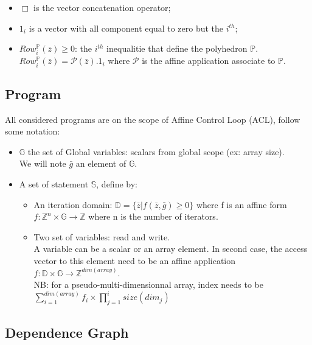 \begin{itemize}
	\item $ \Box $ is the vector concatenation operator;
	\item $ 1_{i} $ is a vector with all component equal to zero but the $i^{th}$;
	\item $ Row_{i}^{\mathbb{P}}(\bar{z}) \geq 0 $: the $i^{th}$ inequalitie that define the polyhedron $\mathbb{P}$.\\
	$Row_{i}^{\mathbb{P}}(\bar{z}) = \mathcal{P}(\bar{z}).1_{i}$ where $\mathcal{P}$ is the affine application associate
	to $\mathbb{P}$.
\end{itemize}
		\subsection{Program}
		\label{polyhedric:maths:}

All considered programs are on the scope of Affine Control Loop (ACL), follow some notation:
\begin{itemize}
	\item $\mathbb{G}$ the set of Global variables: scalars from global scope (ex: array size).\\
	We will note $\bar{g}$ an element of $\mathbb{G}$.
	\item A set of statement $\mathbb{S}$, define by:
	\begin{itemize}
		\item An iteration domain: $\mathbb{D} = \{\bar{z} | f(\bar{z}, \bar{g}) \geq 0\}$ where f is an affine
				form $f: \mathbb{Z}^{n} \times \mathbb{G} \rightarrow \mathbb{Z}$ where n is the number
				of iterators.
		\item Two set of variables: read and write.\\
		A variable can be a scalar or an array element. In second case, the access vector to this element need to
		be an affine application $f: \mathbb{D} \times \mathbb{G} \rightarrow \mathbb{Z}^{dim(array)}$.\\
		NB: for a pseudo-multi-dimensionnal array, index needs to be 
		$\sum_{i=1}^{dim(array)} f_{i} \times \prod_{j=1}^{i} size(dim_{j})$
	\end{itemize}
\end{itemize}

		\subsection{Dependence Graph}

